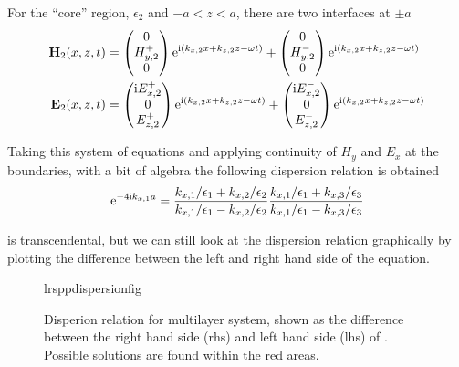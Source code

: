For the ``core'' region, $\epsilon_2$ and $-a<z<a$, there are two
interfaces at $\pm a$
\begin{align}
\mathbf{H}_2(x,z,t) &=
\begin{pmatrix}
0\\
H^+_{y,2}\\
0
\end{pmatrix} {\mathrm{e}}^{{\mathrm{i}}(k_{x,2}x+k_{z,2}z-\omega t)}
+
\begin{pmatrix}
0\\
H^-_{y,2}\\
0
\end{pmatrix} {\mathrm{e}}^{{\mathrm{i}}(k_{x,2}x+k_{z,2}z-\omega t)} \\
\mathbf{E}_2(x,z,t) &=
\begin{pmatrix}
{\mathrm{i}} E^+_{x,2}\\
0\\
E^+_{z,2}\\
\end{pmatrix} {\mathrm{e}}^{{\mathrm{i}}(k_{x,2}x+k_{z,2}z-\omega t)}
+
\begin{pmatrix}
{\mathrm{i}} E^-_{x,2}\\
0\\
E^-_{z,2}\\
\end{pmatrix} {\mathrm{e}}^{{\mathrm{i}}(k_{x,2}x+k_{z,2}z-\omega t)}
\end{align}

Taking this system of equations and applying continuity of $H_y$ and $E_x$
at the boundaries, with a bit of algebra the following dispersion relation
is obtained
\begin{equation}
{\mathrm{e}}^{-4 {\mathrm{i}} k_{x,1} a} = 
\frac{k_{x,1}/\epsilon_1 + k_{x,2}/\epsilon_2}
     {k_{x,1}/\epsilon_1 - k_{x,2}/\epsilon_2}
\frac{k_{x,1}/\epsilon_1 + k_{x,3}/\epsilon_3}
     {k_{x,1}/\epsilon_1 - k_{x,3}/\epsilon_3}
\label{eqn:lrsppdispersion}
\end{equation}

 is transcendental, but we can still look at
the dispersion relation graphically by plotting the difference between the
left and right hand side of the equation.

\begin{figure}[ht]
 \centering
{lrsppdispersionfig}
\label{fig:lrsppdispersionrelation}
\caption{Disperion relation for multilayer system, shown as the difference
 between the right hand side (rhs) and left hand side (lhs) of
.  Possible solutions are found within the
red areas.}
\end{figure}

